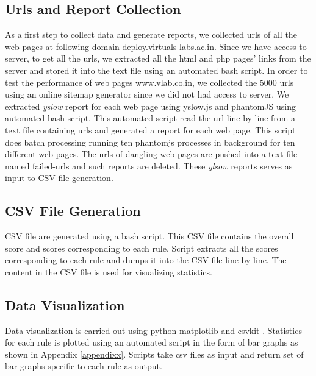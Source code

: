 \documentclass[conference]{IEEEtran}
\begin{document}
\subsection{Urls and Report Collection}\label{sec-4.1}
As a first step to collect data and generate reports, we
collected urls of all the web pages at following domain deploy.virtuals-labs.ac.in.
Since we have access to server, to get all the urls, we extracted
all the html and php pages' links from the server and stored it into the text file
using an automated bash script.
In order to test the performance of web pages www.vlab.co.in, we collected the 5000 urls
using an online sitemap generator since we did not had access to server.
We extracted {\it yslow} report for each web page using yslow.js and phantomJS using automated bash
script. This automated script read the url line by line from a text file containing
urls and generated a report for each web page. This script does batch processing running
ten phantomjs processes in background for ten different web pages. The urls of dangling web pages 
are pushed into a text file named failed-urls and such reports are deleted.
These {\it ylsow} reports serves as input to CSV file generation.

\subsection{CSV File Generation}\label{sec-4.2}
CSV file are generated using a bash script. This CSV file contains the overall
score and scores corresponding to each rule. Script extracts all the scores
corresponding to each rule and dumps it into the CSV file line by line. The
content in the CSV file is used for visualizing statistics.

\subsection{Data Visualization}\label{sec-4.3}
Data visualization is carried out using python matplotlib \cite{matplot} and csvkit \cite{csvkit}. 
Statistics for each rule is plotted using an automated
script in the form of bar graphs as shown in Appendix \ref{appendixx}. Scripts take csv files as input
and return set of bar graphs specific to each rule as output.
\end{document}
